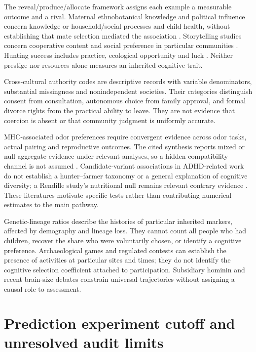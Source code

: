 The reveal/produce/allocate framework assigns each example a measurable outcome and a rival. Maternal ethnobotanical knowledge and political influence concern knowledge or household/social processes and child health, without establishing that mate selection mediated the association \citep{mcdade2007,alami2020}. Storytelling studies concern cooperative content and social preference in particular communities \citep{story}. Hunting success includes practice, ecological opportunity and luck \citep{koster}. Neither prestige nor resources alone measures an inherited cognitive trait.

Cross-cultural authority codes are descriptive records with variable denominators, substantial missingness and nonindependent societies. Their categories distinguish consent from consultation, autonomous choice from family approval, and formal divorce rights from the practical ability to leave. They are not evidence that coercion is absent or that community judgment is uniformly accurate.



MHC-associated odor preferences require convergent evidence across odor tasks, actual pairing and reproductive outcomes. The cited synthesis reports mixed or null aggregate evidence under relevant analyses, so a hidden compatibility channel is not assumed \citep{havlicek2020}. Candidate-variant associations in ADHD-related work do not establish a hunter--farmer taxonomy or a general explanation of cognitive diversity; a Rendille study's nutritional null remains relevant contrary evidence \citep{kunkle2025}. These literatures motivate specific tests rather than contributing numerical estimates to the main pathway.

Genetic-lineage ratios describe the histories of particular inherited markers, affected by demography and lineage loss. They cannot count all people who had children, recover the share who were voluntarily chosen, or identify a cognitive preference. Archaeological games and regulated contests can establish the presence of activities at particular sites and times; they do not identify the cognitive selection coefficient attached to participation. Subsidiary hominin and recent brain-size debates constrain universal trajectories without assigning a causal role to assessment.




\section{Prediction experiment cutoff and unresolved audit limits}

